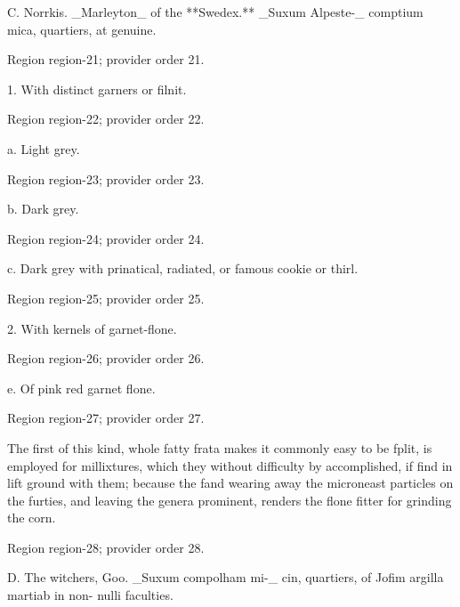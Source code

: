 \documentclass[11pt]{article}
\begin{document}
C. Norrkis. \_Marleyton\_ of the **Swedex.** \_Suxum Alpeste-\_
comptium mica, quartiers, at genuine.
\par

{\scriptsize\color{gray} Region region-21; provider order 21.\par}
\medskip

1. With distinct garners or filnit.
\par

{\scriptsize\color{gray} Region region-22; provider order 22.\par}
\medskip

a. Light grey.
\par

{\scriptsize\color{gray} Region region-23; provider order 23.\par}
\medskip

b. Dark grey.
\par

{\scriptsize\color{gray} Region region-24; provider order 24.\par}
\medskip

c. Dark grey with prinatical, radiated, or famous cookie or thirl.
\par

{\scriptsize\color{gray} Region region-25; provider order 25.\par}
\medskip

2. With kernels of garnet-flone.
\par

{\scriptsize\color{gray} Region region-26; provider order 26.\par}
\medskip

e. Of pink red garnet flone.
\par

{\scriptsize\color{gray} Region region-27; provider order 27.\par}
\medskip

The first of this kind, whole fatty frata makes it commonly easy to be fplit, is employed for millixtures, which they without difficulty by accomplished, if find in lift ground with them; because the fand wearing away the microneast particles on the furties, and leaving the genera prominent, renders the flone fitter for grinding the corn.
\par

{\scriptsize\color{gray} Region region-28; provider order 28.\par}
\medskip

D. The witchers, Goo. \_Suxum compolham mi-\_
cin, quartiers, of Jofim argilla martiab in non- nulli faculties.
\par
\end{document}
